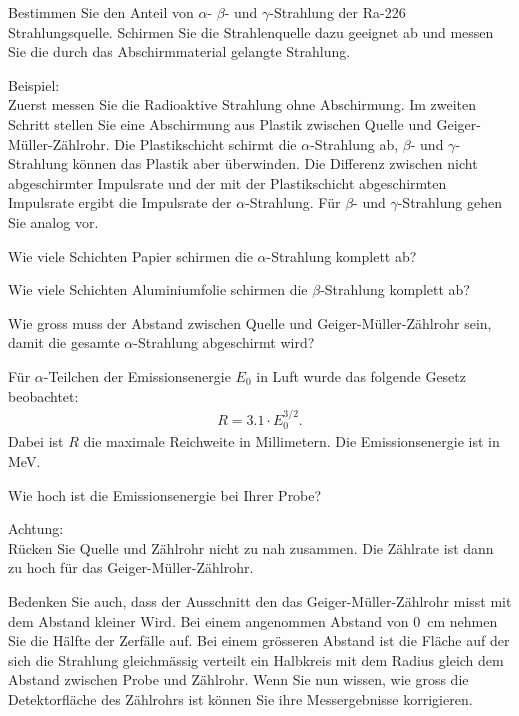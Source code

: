 \documentclass[12pt,a4paper, twosite]{article}
\begin{document}
\begin{aufgabe}
	Bestimmen Sie den Anteil von $\alpha$- $\beta$- und $\gamma$-Strahlung der Ra-226 Strahlungsquelle.
	Schirmen Sie die Strahlenquelle dazu geeignet ab und messen Sie die durch das Abschirmmaterial gelangte Strahlung.

	Beispiel:\\
	Zuerst messen Sie die Radioaktive Strahlung ohne Abschirmung. 
	Im zweiten Schritt stellen Sie eine Abschirmung aus Plastik zwischen Quelle und Geiger-Müller-Zählrohr.
	Die Plastikschicht schirmt die $\alpha$-Strahlung ab, $\beta$- und $\gamma$-Strahlung können das Plastik aber überwinden.
	Die Differenz zwischen nicht abgeschirmter Impulsrate und der mit der Plastikschicht abgeschirmten Impulsrate ergibt die
	Impulsrate der $\alpha$-Strahlung.
	Für $\beta$- und $\gamma$-Strahlung gehen Sie analog vor.
\end{aufgabe}

\begin{aufgabe}
	Wie viele Schichten Papier schirmen die $\alpha$-Strahlung komplett ab?
\end{aufgabe}

\begin{aufgabe}
	Wie viele Schichten Aluminiumfolie schirmen die $\beta$-Strahlung komplett ab?
\end{aufgabe}

\begin{aufgabe}
	Wie gross muss der Abstand zwischen Quelle und Geiger-Müller-Zählrohr sein, 
	damit die gesamte $\alpha$-Strahlung abgeschirmt wird?

	Für $\alpha$-Teilchen der Emissionsenergie $E_0$ in Luft wurde das folgende Gesetz beobachtet:
	\begin{eqnarray*}
		R = \num{3.1} \cdot E_0^{3/2}\text{.}
	\end{eqnarray*}
	Dabei ist $R$ die maximale Reichweite in Millimetern. Die Emissionsenergie ist in MeV.

	Wie hoch ist die Emissionsenergie bei Ihrer Probe? 

	Achtung:\\
	Rücken Sie Quelle und Zählrohr nicht zu nah zusammen. Die Zählrate ist dann zu hoch für das Geiger-Müller-Zählrohr.

	Bedenken Sie auch, dass der Ausschnitt den das Geiger-Müller-Zählrohr misst mit dem Abstand kleiner Wird.
	Bei einem angenommen Abstand von \SI{0}{cm} nehmen Sie die Hälfte der Zerfälle auf.
	Bei einem grösseren Abstand ist die Fläche auf der sich die Strahlung gleichmässig verteilt 
	ein Halbkreis mit dem Radius gleich dem Abstand zwischen Probe und Zählrohr.
	Wenn Sie nun wissen, wie gross die Detektorfläche des Zählrohrs ist können Sie ihre Messergebnisse korrigieren.

\end{aufgabe}
\end{document}
